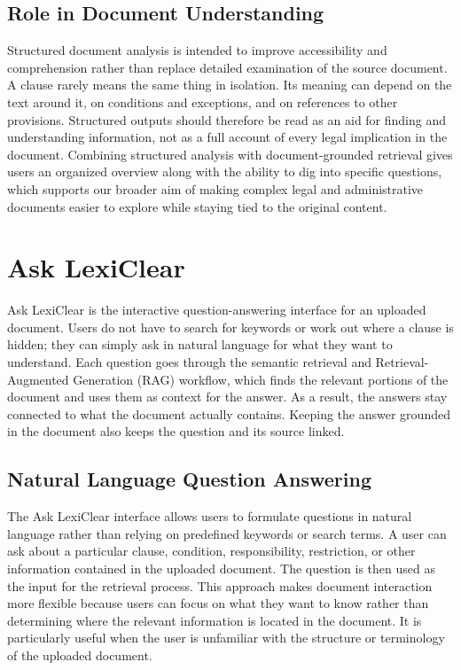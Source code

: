 \documentclass[12pt,a4paper,oneside]{report}
\begin{document}
\subsection{Role in Document Understanding}

Structured document analysis is intended to improve accessibility and
comprehension rather than replace detailed examination of the source
document. A clause rarely means the same thing in isolation. Its meaning can depend on the text around it, on conditions and exceptions, and on references to other provisions. Structured outputs should therefore be read as an aid for finding and understanding information, not as a full account of every legal implication in the document. Combining structured analysis with document-grounded retrieval gives users an organized overview along with the ability to dig into specific questions, which supports our broader aim of making complex legal and administrative documents easier to explore while staying tied to the original content.

\section{Ask LexiClear}

Ask LexiClear is the interactive question-answering interface for an uploaded document. Users do not have to search for keywords or work out where a clause is hidden; they can simply ask in natural language for what they want to understand. Each question goes through the semantic retrieval and Retrieval-Augmented Generation (RAG) workflow, which finds the relevant portions of the document and uses them as context for the answer. As a result, the answers stay connected to what the document actually contains. Keeping the answer grounded in the document also keeps the question and its source linked.

\subsection{Natural Language Question Answering}

The Ask LexiClear interface allows users to formulate questions in natural
language rather than relying on predefined keywords or search terms. A user
can ask about a particular clause, condition, responsibility, restriction, or
other information contained in the uploaded document. The question is then
used as the input for the retrieval process. This approach makes document interaction more flexible because users can
focus on what they want to know rather than determining where the relevant
information is located in the document. It is particularly useful when the
user is unfamiliar with the structure or terminology of the uploaded
document.
\end{document}
